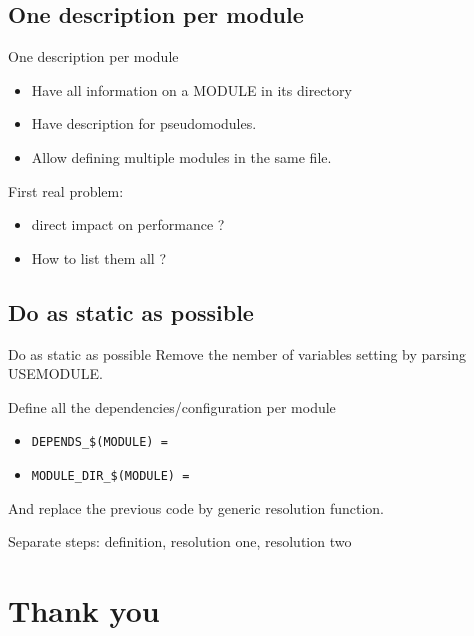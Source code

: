 \documentclass[ucs,9pt]{beamer}
\begin{document}
\subsection{One description per module}

\begin{frame}{One description per module}

  \begin{itemize}
    \item
      Have all information on a MODULE in its directory
    \item
      Have description for pseudomodules.
    \item
      Allow defining multiple modules in the same file.
  \end{itemize}

  \pause
  First real problem:
  \begin{itemize}
    \item
      direct impact on performance ?
    \item
      How to list them all ?
  \end{itemize}

\end{frame}


\subsection{Do as static as possible}

\begin{frame}{Do as static as possible}
  Remove the nember of variables setting by parsing USEMODULE.

  \bigskip
  Define all the dependencies/configuration per module
  \begin{itemize}
    \item
      \texttt{DEPENDS\_\$(MODULE) = }
    \item
      \texttt{MODULE\_DIR\_\$(MODULE) = }
  \end{itemize}

  And replace the previous code by generic resolution function.

  \bigskip
  Separate steps: definition, resolution one, resolution two

\end{frame}

\section{Thank you}
\end{document}
